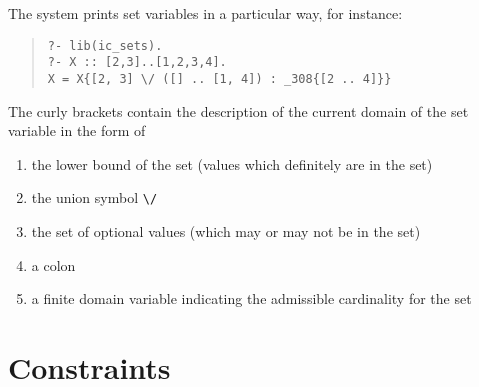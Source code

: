 The system prints set variables in a particular way, for instance:
\begin{quote}\begin{verbatim}
?- lib(ic_sets).
?- X :: [2,3]..[1,2,3,4].
X = X{[2, 3] \/ ([] .. [1, 4]) : _308{[2 .. 4]}}
\end{verbatim}\end{quote}
The curly brackets contain the description of the current domain
of the set variable in the form of
\begin{enumerate}
\item the lower bound of the set (values which definitely are in the set)
\item the union symbol \verb.\/.
\item the set of optional values (which may or may not be in the set)
\item a colon
\item a finite domain variable indicating the admissible cardinality for the set
\end{enumerate}


\section{Constraints}

